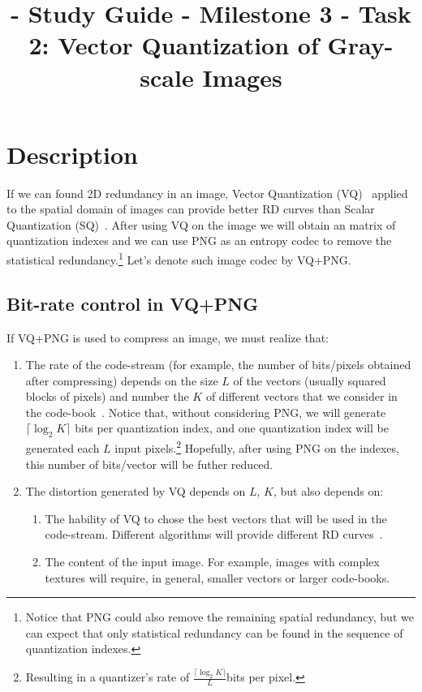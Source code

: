 

\title{\SM{} - Study Guide - Milestone 3 - Task 2: Vector Quantization of Gray-scale Images}

\maketitle
\tableofcontents

\section{Description}

If we can found 2D redundancy in an image, Vector Quantization
(VQ)~\cite{vruiz__vector_quantization} applied to the spatial domain
of images can provide better RD curves than Scalar Quantization
(SQ)~\cite{vruiz__scalar_quantization}. After using VQ on the image we
will obtain an matrix of quantization indexes and we can use PNG as an
entropy codec to remove the statistical redundancy.\footnote{Notice
that PNG could also remove the remaining spatial redundancy, but we
can expect that only statistical redundancy can be found in the
sequence of quantization indexes.} Let's denote such image codec by
VQ+PNG.


\subsection{Bit-rate control in VQ+PNG}

If VQ+PNG is used to compress an image, we must realize that:
\begin{enumerate}
\item The rate of the code-stream (for example, the number of
  bits/pixels obtained after compressing) depends on the size $L$ of
  the vectors (usually squared blocks of pixels) and number the $K$ of
  different vectors that we consider in the
  code-book~\cite{vruiz__vector_quantization}. Notice that, without
  considering PNG, we will generate $\lceil\log_2 K\rceil$ bits per
  quantization index, and one quantization index will be generated
  each $L$ input pixels.\footnote{Resulting in a quantizer's rate of
  $\frac{\lceil\log_2 K\rceil}{L}$bits per pixel.} Hopefully, after
  using PNG on the indexes, this number of bits/vector will be futher
  reduced.
\item The distortion generated by VQ depends on $L$, $K$, but also
  depends on:
  \begin{enumerate}
  \item The hability of VQ to chose the best vectors that will be used
    in the code-stream. Different algorithms will provide different RD
    curves~\cite{vruiz__information_theory}.
  \item The content of the input image. For example, images with
    complex textures will require, in general, smaller vectors or
    larger code-books.
  \end{enumerate}
\end{enumerate}

